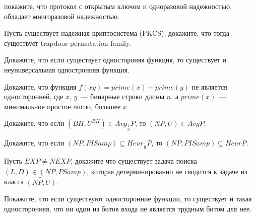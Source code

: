 \setcounter{curtask}{26}


\begin{task}
    покажите, что протокол с открытым ключом и одноразовой надежностью, обладает
    многоразовой надежностью.
\end{task}

\begin{task}
    Пусть существует надежная криптосистема (PKCS), докажите, что тогда существует
    trapdoor permutation family.
\end{task}

\begin{task}
    Докажите, что если существует одностороняя функция, то существует и
    неуниверсальная одностронняя функция.
\end{task}

\breakline

\begin{ptask}{12}
    Докажите, что функция $f(xy) = prime(x) + prime(y)$ не является односторонней,
    где $x$, $y$~--- бинарные строки длины $n$, а $prime(x)$~--- минимальное простое
    число, большее $x$.
\end{ptask}

\begin{ptask}{20}
    Докажите, что если $(BH, U^{BH}) \in Avg_{\frac{1}{n}}P$, то $(NP, U) \in AvgP$.
\end{ptask}

\begin{ptask}{21}
    Докажите, что если $(NP, PISamp) \subseteq Heur_{\frac{1}{n}}P$, то $(NP, PISamp)
    \subseteq HeurP$.
\end{ptask}

\begin{ptask}{22}
    Пусть $EXP \neq NEXP$, докажите что существует задача поиска $(L, D) \in
    \widetilde{(NP, PSamp)}$,
    которая детерминированно не сводится к задаче из класса $\widetilde{(NP, U)}$.
\end{ptask}

\begin{ptask}{24}
    Покажите, что если существуют односторонние функции, то существует и такая
    односторонняя, что ни один из битов входа не является трудным битом для нее.
\end{ptask}